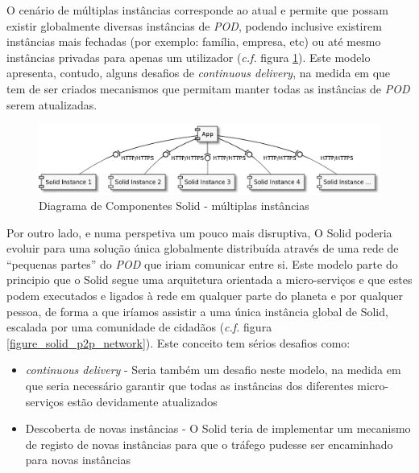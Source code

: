 O cenário de múltiplas instâncias corresponde ao atual e permite que possam existir globalmente diversas instâncias de \emph{\acrshort{POD}}, podendo inclusive existirem instâncias mais fechadas (por exemplo: família, empresa, etc) ou até mesmo instâncias privadas para apenas um utilizador (\emph{c.f.} figura \ref{figure_solid_multiple_instances}). Este modelo apresenta, contudo, alguns desafios de \emph{continuous delivery}, na medida em que tem de ser criados mecanismos que permitam manter todas as instâncias de \emph{\acrshort{POD}} serem atualizadas.

\begin{figure}[H]
    \begin{center}
    \includegraphics[width=0.8 \textwidth]{figures/solid_web1.eps}
    \caption{Diagrama de Componentes Solid - múltiplas instâncias}
    \label{figure_solid_multiple_instances}
    \end{center}
\end{figure}


Por outro lado, e numa perspetiva um pouco mais disruptiva, O Solid poderia evoluir para uma solução única globalmente distribuída através de uma rede de “pequenas partes” do \emph{\acrshort{POD}} que iriam comunicar entre si. Este modelo parte do principio que o Solid segue uma arquitetura orientada a micro-serviços e que estes podem executados e ligados à rede em qualquer parte do planeta e por qualquer pessoa, de forma a que iríamos assistir a uma única instância global de Solid, escalada por uma comunidade de cidadãos (\emph{c.f.} figura \ref{figure_solid_p2p_network}).
Este conceito tem sérios desafios como:
\begin{itemize}
    \item \emph{continuous delivery} - Seria também um desafio neste modelo, na medida em que seria necessário garantir que todas as instâncias dos diferentes micro-serviços estão devidamente atualizados
    \item Descoberta de novas instâncias - O Solid teria de implementar um mecanismo de registo de novas instâncias para que o tráfego pudesse ser encaminhado para novas instâncias
\end{itemize}


